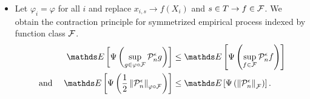 \documentclass[11pt]{article}
\begin{document}
\begin{itemize}
\item \begin{remark}
Let $\varphi_i = \varphi$ for all $i$ and replace $x_{i,s} \to f(X_i)$ and $s\in T \to f\in {\mathcal F}$. We obtain the contraction principle for symmetrized empirical process indexed by function class ${\mathcal F}$.
\begin{align}
\E{}{\Psi\paren{\sup_{g \in \varphi \circ \cF} \cP_n^{\epsilon} g}} &\le \E{}{\Psi\paren{\sup_{f \in \cF} \cP_n^{\epsilon}f}} \label{ineqn: contraction_principle_3} \\
\text{ and }  \quad \E{}{\Psi\paren{\frac{1}{2}\norm{\cP_n^{\epsilon}}{\varphi \circ \cF}}} &\le \E{}{\Psi\paren{\norm{\cP_n^{\epsilon}}{\cF}}}. \nonumber
\end{align}
\end{remark}
\end{itemize}
\end{document}
